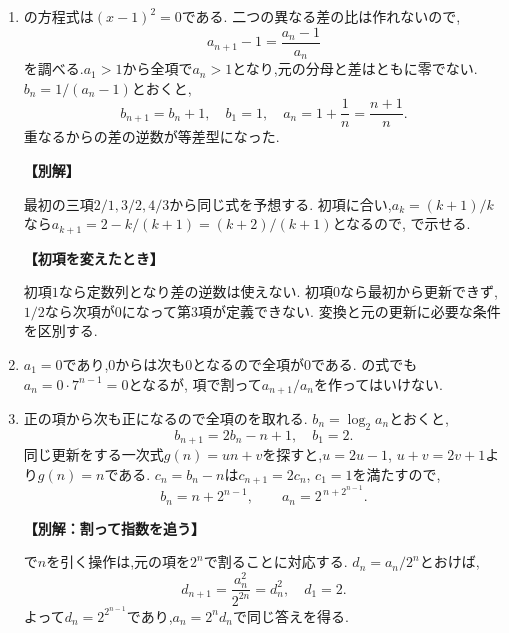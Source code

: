 \begin{enumerate}[label=\textbf{問\arabic*.},leftmargin=3.8em,format=\bookitemlink{practice-basic}{solution}{problem}]
          \item {}の方程式は$(x-1)^2=0$である.
                  二つの異なる差の比は作れないので,
                  \[
                    a_{n+1}-1=\frac{a_n-1}{a_n}
                  \]
                  を調べる.$a_1>1$から全項で$a_n>1$となり,元の分母と差はともに零でない.
                  $b_n=1/(a_n-1)$とおくと,
                  \[
                    b_{n+1}=b_n+1,\quad b_1=1,
                    \quad a_n=1+\frac1n=\frac{n+1}n.
                  \]
                  重なるからの差の逆数が等差型になった.
                  \par\smallskip\noindent\textbf{【別解】}\par
                  最初の三項$2/1,3/2,4/3$から同じ式を予想する.
                  初項に合い,$a_k=(k+1)/k$なら$a_{k+1}=2-k/(k+1)=(k+2)/(k+1)$となるので,
                  で示せる.
                  \par\smallskip\noindent\textbf{【初項を変えたとき】}\par\nopagebreak[4]
                  初項$1$なら定数列となり差の逆数は使えない.
                  初項$0$なら最初から更新できず,$1/2$なら次項が$0$になって第3項が定義できない.
                  変換と元の更新に必要な条件を区別する.

          \item $a_1=0$であり,$0$からは次も$0$となるので全項が$0$である.
                  の式でも$a_n=0\cdot7^{n-1}=0$となるが,
                  項で割って$a_{n+1}/a_n$を作ってはいけない.

          \item 正の項から次も正になるので全項のを取れる.
                  $b_n=\log_2a_n$とおくと,
                  \[
                    b_{n+1}=2b_n-n+1,\quad b_1=2.
                  \]
                  同じ更新をする一次式$g(n)=un+v$を探すと,$u=2u-1$, $u+v=2v+1$より$g(n)=n$である.
                  $c_n=b_n-n$は$c_{n+1}=2c_n$, $c_1=1$を満たすので,
                  \[
                    b_n=n+2^{n-1},\qquad a_n=2^{\,n+2^{n-1}}.
                  \]
                  \par\smallskip\noindent\textbf{【別解：割って指数を追う】}\par
                  で$n$を引く操作は,元の項を$2^n$で割ることに対応する.
                  $d_n=a_n/2^n$とおけば,
                  \[
                    d_{n+1}=\frac{a_n^2}{2^{2n}}=d_n^2,\quad d_1=2.
                  \]
                  よって$d_n=2^{2^{n-1}}$であり,$a_n=2^nd_n$で同じ答えを得る.


\end{enumerate}
